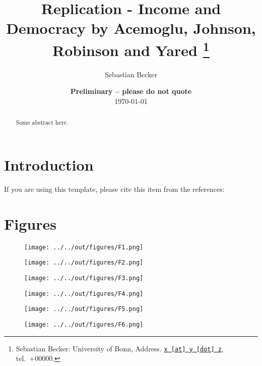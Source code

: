 \documentclass[11pt, a4paper, leqno]{article}
\begin{document}
\title{Replication - Income and Democracy by Acemoglu, Johnson, Robinson and Yared
\thanks{Sebastian Becker: University of Bonn, Address. \href{mailto:x@y.z} {\nolinkurl{x [at] y [dot] z}}, tel.~+00000.}
}

\author{Sebastian Becker
}

\date{
{\bf Preliminary -- please do not quote}
\\[1ex]
\today
}

\maketitle


\begin{abstract}
	Some abstract here.
\end{abstract}
\clearpage

\section{Introduction} %
\label{sec:introduction}

If you are using this template, please cite this item from the references: \citet{GaudeckerEconProjectTemplates}




\newpage{}

\section{Figures}


\begin{figure}[!htbp]
	\texttt{[image: ../../out/figures/F1.png]}
\end{figure}


\begin{figure}[!htbp]
	\texttt{[image: ../../out/figures/F2.png]}
\end{figure}
\begin{figure}[!htbp]
    \texttt{[image: ../../out/figures/F3.png]}
\end{figure}
\begin{figure}[!htbp]
    \texttt{[image: ../../out/figures/F4.png]}
\end{figure}
\begin{figure}[!htbp]
    \texttt{[image: ../../out/figures/F5.png]}
\end{figure}
\begin{figure}[!htbp]
    \texttt{[image: ../../out/figures/F6.png]}
\end{figure}
\end{document}
